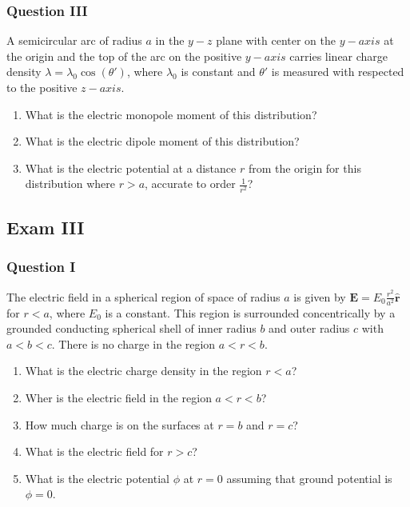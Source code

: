 \documentclass[oneside]{book}
\theoremstyle{definition}
\newcommand*\B[1]{\mathbf{#1}}
\newcommand*\Bh[1]{\mathbf{\hat{#1}}}
\begin{document}
\subsubsection{Question III}
A semicircular arc of radius $a$ in the $y-z$ plane with center on the $y-axis$ at the origin and the top of the arc on the positive $y-axis$ carries linear charge density $\lambda = \lambda_0 \cos(\theta')$, where $\lambda_0$ is constant and $\theta'$ is measured with respected to the positive $z-axis$.
\begin{enumerate}
\item What is the electric monopole moment of this distribution?
\item What is the electric dipole moment of this distribution?
\item What is the electric potential at a distance $r$ from the origin for this distribution where $r>a$, accurate to order $\frac{1}{r^2}$?
\end{enumerate}

\subsection*{Exam III}

\subsubsection{Question I}
The electric field in a spherical region of space of radius $a$ is given by $\B{E} = E_0 \frac{r^2}{a^2}\Bh{r}$ for $r< a$, where $E_0$ is a constant. This region is surrounded concentrically by a grounded conducting spherical shell of inner radius $b$ and outer radius $c$ with $a<b<c$. There is no charge in the region $a<r<b$. 
\begin{enumerate}
\item What is the electric charge density in the region $r<a$?
\item Wher is the electric field in the region $a<r<b$?
\item How much charge is on the surfaces at $r=b$ and $r=c$?
\item What is the electric field for $r>c$?
\item What is the electric potential $\phi$ at $r=0$ assuming that ground potential is $\phi = 0$.
\end{enumerate}
\end{document}
